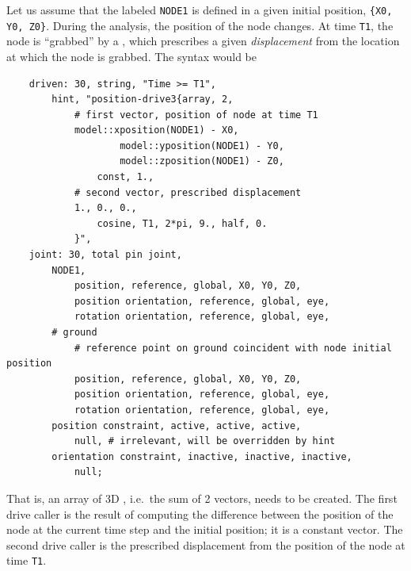 Let us assume that the  labeled \texttt{NODE1} is defined in a given initial position, \texttt{\{X0, Y0, Z0\}}.
During the analysis, the position of the node changes.  At time \texttt{T1}, the node is ``grabbed''
by a , which prescribes a given \emph{displacement} from the location at which the node is grabbed.
The syntax would be
\begin{verbatim}
    driven: 30, string, "Time >= T1",
        hint, "position-drive3{array, 2,
            # first vector, position of node at time T1
            model::xposition(NODE1) - X0,
                    model::yposition(NODE1) - Y0,
                    model::zposition(NODE1) - Z0,
                const, 1.,
            # second vector, prescribed displacement
            1., 0., 0.,
                cosine, T1, 2*pi, 9., half, 0.
            }",
    joint: 30, total pin joint,
        NODE1,
            position, reference, global, X0, Y0, Z0,
            position orientation, reference, global, eye,
            rotation orientation, reference, global, eye,
        # ground
            # reference point on ground coincident with node initial position
            position, reference, global, X0, Y0, Z0,
            position orientation, reference, global, eye,
            rotation orientation, reference, global, eye,
        position constraint, active, active, active,
            null, # irrelevant, will be overridden by hint
        orientation constraint, inactive, inactive, inactive,
            null;
\end{verbatim}
That is, an array of 3D , i.e.\ the sum of 2 vectors, needs to be created.
The first drive caller is the result of computing the difference between the position
of the node at the current time step and the initial position; it is a constant vector.
The second drive caller is the prescribed displacement from the position of the node at time \texttt{T1}.

